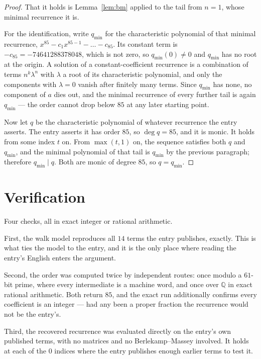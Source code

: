 \documentclass[11pt,a4paper]{article}
\theoremstyle{plain}
\theoremstyle{definition}
\begin{document}
\begin{proof}
That it holds is Lemma~\ref{lem:bm} applied to the tail from $n=1$, whose minimal
recurrence it is.

For the identification, write $q_{\min}$ for the characteristic polynomial of that minimal
recurrence, $x^{85}-c_1x^{85-1}-\dots-c_{85}$. Its constant term is
$-c_{85}=-74641288378048$, which is not zero, so $q_{\min}(0)\neq0$ and $q_{\min}$ has no
root at the origin. A solution of a constant-coefficient recurrence is a combination of terms
$n^{k}\lambda^{n}$ with $\lambda$ a root of its characteristic polynomial, and only the
components with $\lambda=0$ vanish after finitely many terms. Since $q_{\min}$ has none, no
component of $a$ dies out, and the minimal recurrence of every further tail is again
$q_{\min}$ --- the order cannot drop below $85$ at any later starting point.

Now let $q$ be the characteristic polynomial of whatever recurrence the entry asserts. The
entry asserts it has order $85$, so $\deg q=85$, and it is monic. It holds from some
index $t$ on. From $\max(t,1)$ on, the sequence satisfies both $q$ and $q_{\min}$, and
the minimal polynomial of that tail is $q_{\min}$ by the previous paragraph; therefore
$q_{\min}\mid q$. Both are monic of degree $85$, so $q=q_{\min}$.
\end{proof}

\section{Verification}

Four checks, all in exact integer or rational arithmetic.

First, the walk model reproduces all $14$ terms the entry publishes, exactly. This is
what ties the model to the entry, and it is the only place where reading the entry's English
enters the argument.

Second, the order was computed twice by independent routes: once modulo a $61$-bit prime, where
every intermediate is a machine word, and once over $\mathbb{Q}$ in exact rational arithmetic.
Both return $85$, and the exact run additionally confirms every coefficient is an integer
--- had any been a proper fraction the recurrence would not be the entry's.

Third, the recovered recurrence was evaluated directly on the entry's own published terms, with
no matrices and no Berlekamp--Massey involved. It holds at each of the $0$ indices where
the entry publishes enough earlier terms to test it.
\end{document}
